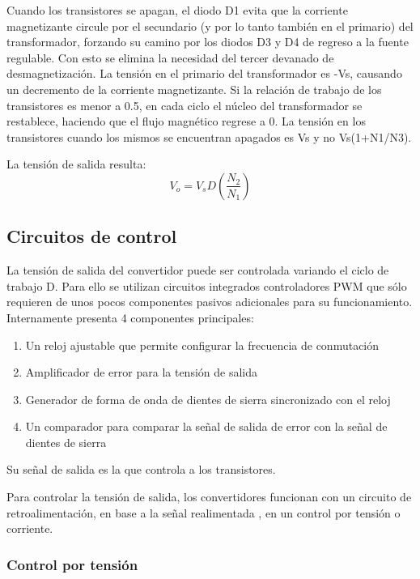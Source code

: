 Cuando los transistores se apagan, el diodo D1 evita que la corriente magnetizante circule por el secundario 
(y por lo tanto también en el primario) del transformador, forzando su camino por los diodos D3 y D4 de regreso a la fuente regulable.  
Con esto se elimina la necesidad del tercer devanado de desmagnetización. 
La tensión en el primario del transformador es -Vs, causando un decremento de la corriente magnetizante. 
Si la relación de trabajo de los transistores es menor a 0.5, en cada ciclo el núcleo del transformador se restablece, 
haciendo que el flujo magnético regrese a 0. 
La tensión en los transistores cuando los mismos se encuentran apagados es Vs y no Vs(1+N1/N3).

La tensión de salida resulta:
$$ V_{o}=V_{s}D(\frac{N_{2}}{N_{1}}) $$




\subsection{Circuitos de control}

La tensión de salida del convertidor puede ser controlada variando el ciclo de trabajo D. 
Para ello se utilizan circuitos integrados controladores PWM que sólo requieren de unos pocos componentes pasivos adicionales para su funcionamiento. 
Internamente presenta 4 componentes principales:
\begin{enumerate}
    \item Un reloj ajustable que permite configurar la frecuencia de conmutación
    \item Amplificador de error para la tensión de salida
    \item Generador de forma de onda de dientes de sierra sincronizado con el reloj
    \item Un comparador para comparar la señal de salida de error con la señal de dientes de sierra
\end{enumerate}

Su señal de salida es la que controla a los transistores. 

Para controlar la tensión de salida, los convertidores funcionan con un circuito de retroalimentación,
 en base a la señal realimentada , en un control por tensión o corriente.

\subsubsection{Control por tensión}

